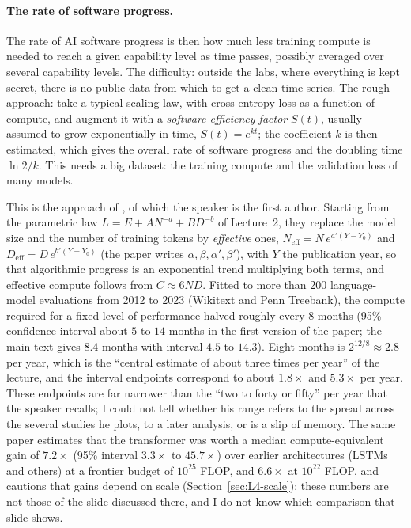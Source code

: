 \paragraph{The rate of software progress.}
The rate of AI software progress is then how much less training compute is needed to reach a given capability level as time passes, possibly averaged over several capability levels. The difficulty: outside the labs, where everything is kept secret, there is no public data from which to get a clean time series. The rough approach: take a typical scaling law, with cross-entropy loss as a function of compute, and augment it with a \emph{software efficiency factor} $S(t)$, usually assumed to grow exponentially in time, $S(t)=e^{kt}$; the coefficient $k$ is then estimated, which gives the overall rate of software progress and the doubling time $\ln2/k$. This needs a big dataset: the training compute and the validation loss of many models.

\begin{beyond}
This is the approach of \citet{ho2024}, of which the speaker is the first author. Starting from the parametric law $L=E+AN^{-a}+BD^{-b}$ of Lecture~2, they replace the model size and the number of training tokens by \emph{effective} ones, $N_{\mathrm{eff}}=N\,e^{a'(Y-Y_0)}$ and $D_{\mathrm{eff}}=D\,e^{b'(Y-Y_0)}$ (the paper writes $\alpha,\beta,\alpha',\beta'$), with $Y$ the publication year, so that algorithmic progress is an exponential trend multiplying both terms, and effective compute follows from $C\approx6ND$. Fitted to more than 200 language-model evaluations from 2012 to 2023 (Wikitext and Penn Treebank), the compute required for a fixed level of performance halved roughly every $8$ months (95\% confidence interval about $5$ to $14$ months in the first version of the paper; the main text gives $8.4$ months with interval $4.5$ to $14.3$). Eight months is $2^{12/8}\approx2.8$ per year, which is the ``central estimate of about three times per year'' of the lecture, and the interval endpoints correspond to about $1.8\times$ and $5.3\times$ per year. These endpoints are far narrower than the ``two to forty or fifty'' per year that the speaker recalls; I could not tell whether his range refers to the spread across the several studies he plots, to a later analysis, or is a slip of memory. The same paper estimates that the transformer was worth a median compute-equivalent gain of $7.2\times$ (95\% interval $3.3\times$ to $45.7\times$) over earlier architectures (LSTMs and others) at a frontier budget of $10^{25}$ FLOP, and $6.6\times$ at $10^{22}$ FLOP, and cautions that gains depend on scale (Section~\ref{sec:L4-scale}); these numbers are not those of the slide discussed there, and I do not know which comparison that slide shows.
\end{beyond}

